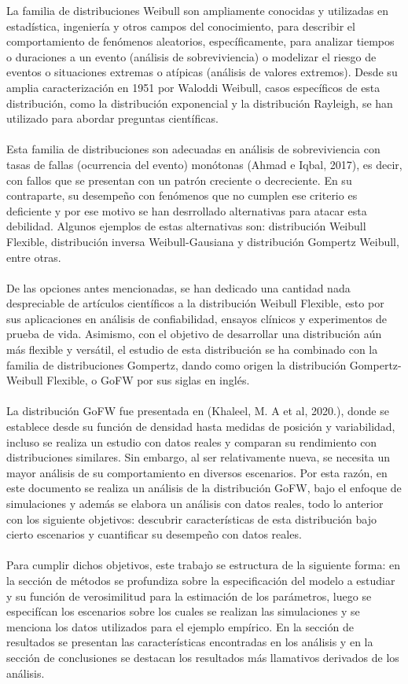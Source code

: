 \documentclass[12pt,a4paper]{article}
\begin{document}
La familia de distribuciones Weibull son ampliamente conocidas y utilizadas en estadística, ingeniería y otros campos del conocimiento, para describir el comportamiento de fenómenos aleatorios, específicamente,  para analizar tiempos o duraciones a un evento (análisis de sobreviviencia) o modelizar el riesgo de eventos o situaciones extremas o atípicas (análisis de valores extremos). Desde su amplia caracterización en 1951 por  Waloddi Weibull, casos específicos de esta distribución, como la distribución exponencial y la distribución Rayleigh, se han utilizado para abordar preguntas científicas.\\
\\
Esta familia de distribuciones son adecuadas en análisis de sobreviviencia con tasas de fallas (ocurrencia del evento) monótonas (Ahmad e Iqbal, 2017), es decir, con fallos que se presentan con un patrón creciente o decreciente. En su contraparte, su desempeño con fenómenos que no cumplen ese criterio es deficiente y por ese motivo se han desrrollado alternativas para atacar esta debilidad. Algunos ejemplos de estas alternativas son: distribución Weibull Flexible, distribución inversa Weibull-Gausiana y distribución Gompertz Weibull, entre otras.\\
\\
De las opciones antes mencionadas, se han dedicado una cantidad nada despreciable de artículos científicos a la distribución Weibull Flexible, esto por sus aplicaciones en análisis de confiabilidad, ensayos clínicos y experimentos de prueba de vida. Asimismo, con el objetivo de desarrollar una distribución aún más flexible y versátil, el estudio de esta distribución se ha combinado con la familia de distribuciones Gompertz, dando como origen la distribución Gompertz-Weibull Flexible, o GoFW por sus siglas en inglés.\\
\\
La distribución GoFW fue presentada en (Khaleel, M. A et al, 2020.), donde se establece desde su función de densidad hasta medidas de posición y variabilidad, incluso se realiza un estudio con datos reales y comparan su rendimiento con distribuciones similares. Sin embargo, al ser relativamente nueva, se necesita un mayor análisis de su comportamiento en diversos escenarios. Por esta razón, en este documento se realiza un análisis de la distribución GoFW, bajo el enfoque de simulaciones y además se elabora un análisis con datos reales, todo lo anterior con los siguiente objetivos: descubrir características de esta distribución bajo cierto escenarios y cuantificar su desempeño con datos reales.\\
\\
Para cumplir dichos objetivos, este trabajo se estructura de la siguiente forma: en la sección de métodos se profundiza sobre la especificación del modelo a estudiar y su función de verosimilitud para la estimación de los parámetros, luego se especifícan los escenarios sobre los cuales se realizan las simulaciones y se menciona los datos utilizados para el ejemplo empírico. En la sección de resultados se presentan las características encontradas en los análisis y en la sección de conclusiones se destacan los resultados más llamativos derivados de los análisis.
\end{document}
